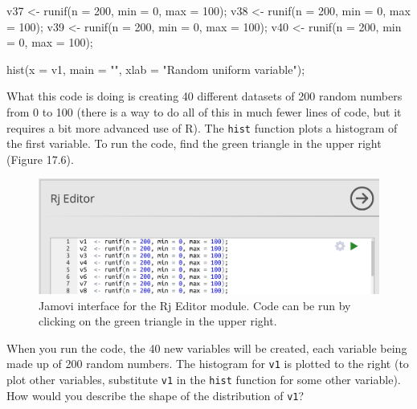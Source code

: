\documentclass[
  openany]{krantz}
\makeatletter
\newenvironment{Shaded}{\begin{snugshade}}{\end{snugshade}}
\newcommand{\AttributeTok}[1]{\textcolor[rgb]{0.61,0.61,0.61}{#1}}
\newcommand{\DecValTok}[1]{\textcolor[rgb]{0.06,0.06,0.06}{#1}}
\newcommand{\FunctionTok}[1]{\textcolor[rgb]{0,0,0}{#1}}
\newcommand{\NormalTok}[1]{#1}
\newcommand{\OtherTok}[1]{\textcolor[rgb]{0.37,0.37,0.37}{#1}}
\newcommand{\StringTok}[1]{\textcolor[rgb]{0.5,0.5,0.5}{#1}}
\newenvironment{kframe}{%
\medskip{}
\setlength{\fboxsep}{.8em}
 \def\at@end@of@kframe{}%
 \ifinner\ifhmode%
  \def\at@end@of@kframe{\end{minipage}}%
  \begin{minipage}{\columnwidth}%
 \fi\fi%
 \def\FrameCommand##1{\hskip\@totalleftmargin \hskip-\fboxsep
 \colorbox{shadecolor}{##1}\hskip-\fboxsep
     \hskip-\linewidth \hskip-\@totalleftmargin \hskip\columnwidth}%
 \MakeFramed {\advance\hsize-\width
   \@totalleftmargin\z@ \linewidth\hsize
   \@setminipage}}%
 {\par\unskip\endMakeFramed%
 \at@end@of@kframe}
\renewenvironment{Shaded}{\begin{kframe}}{\end{kframe}}
\makeatother
\begin{document}
\begin{Shaded}
\begin{Highlighting}[]
\NormalTok{v37 }\OtherTok{\textless{}{-}} \FunctionTok{runif}\NormalTok{(}\AttributeTok{n =} \DecValTok{200}\NormalTok{, }\AttributeTok{min =} \DecValTok{0}\NormalTok{, }\AttributeTok{max =} \DecValTok{100}\NormalTok{);}
\NormalTok{v38 }\OtherTok{\textless{}{-}} \FunctionTok{runif}\NormalTok{(}\AttributeTok{n =} \DecValTok{200}\NormalTok{, }\AttributeTok{min =} \DecValTok{0}\NormalTok{, }\AttributeTok{max =} \DecValTok{100}\NormalTok{);}
\NormalTok{v39 }\OtherTok{\textless{}{-}} \FunctionTok{runif}\NormalTok{(}\AttributeTok{n =} \DecValTok{200}\NormalTok{, }\AttributeTok{min =} \DecValTok{0}\NormalTok{, }\AttributeTok{max =} \DecValTok{100}\NormalTok{);}
\NormalTok{v40 }\OtherTok{\textless{}{-}} \FunctionTok{runif}\NormalTok{(}\AttributeTok{n =} \DecValTok{200}\NormalTok{, }\AttributeTok{min =} \DecValTok{0}\NormalTok{, }\AttributeTok{max =} \DecValTok{100}\NormalTok{);}

\FunctionTok{hist}\NormalTok{(}\AttributeTok{x =}\NormalTok{ v1, }\AttributeTok{main =} \StringTok{""}\NormalTok{, }\AttributeTok{xlab =} \StringTok{"Random uniform variable"}\NormalTok{);}
\end{Highlighting}
\end{Shaded}

What this code is doing is creating 40 different datasets of 200 random numbers from 0 to 100 (there is a way to do all of this in much fewer lines of code, but it requires a bit more advanced use of R).
The \texttt{hist} function plots a histogram of the first variable.
To run the code, find the green triangle in the upper right (Figure 17.6).

\begin{figure}
\includegraphics[width=0.8\linewidth]{img/jamovi_RjEditor} \caption{Jamovi interface for the Rj Editor module. Code can be run by clicking on the green triangle in the upper right.}\label{fig:unnamed-chunk-71}
\end{figure}

When you run the code, the 40 new variables will be created, each variable being made up of 200 random numbers.
The histogram for \texttt{v1} is plotted to the right (to plot other variables, substitute \texttt{v1} in the \texttt{hist} function for some other variable).
How would you describe the shape of the distribution of \texttt{v1}?
\end{document}
